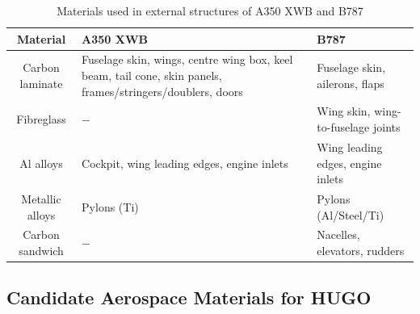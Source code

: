 \begin{table}[H]
   \caption{Materials used in external structures of A350 XWB\cite{skinmaterials_1} and B787\cite{skinmaterials_2}}
    \centering
    \begin{tabular}{|c|p{6cm}|p{6cm}|}
    \hline
        \textbf{Material} & \textbf{A350 XWB} & \textbf{B787} \\
        \hline\hline
         Carbon laminate & Fuselage skin, wings, centre wing box, keel beam, tail cone, skin panels, frames/stringers/doublers, doors & Fuselage skin, ailerons, flaps \\\hline
         Fibreglass & $-$ & Wing skin, wing-to-fuselage joints\\\hline
         Al alloys & Cockpit, wing leading edges, engine inlets & Wing leading edges, engine inlets\\\hline
         Metallic alloys & Pylons (Ti) & Pylons (Al/Steel/Ti)\\\hline
         Carbon sandwich & $-$ & Nacelles, elevators, rudders\\ \hline
    \end{tabular}
    \label{tab:materials_airliner_breakdown}
\end{table}



\subsection{Candidate Aerospace Materials for HUGO}
\label{sub:materials_candidates}

